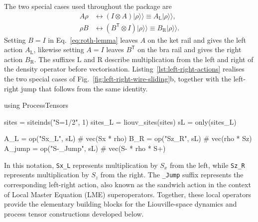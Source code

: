 The two special cases used throughout the package are
%
\begin{align}
    A\rho
    &\longleftrightarrow (I\otimes A)\lvert\rho\rangle\!\rangle \equiv
    A_{\mathrm L}\lvert\rho\rangle\!\rangle,
    \label{eq:left-action}\\
    \rho B
    &\longleftrightarrow (B^{\mathsf T}\otimes I)\lvert\rho\rangle\!\rangle \equiv
    B_{\mathrm R}\lvert\rho\rangle\!\rangle.
    \label{eq:right-action}
\end{align}
%
Setting \(B=I\) in Eq.~\eqref{eq:roth-lemma} leaves \(A\) on the ket rail and gives the left action \(A_{\mathrm L}\), likewise setting \(A=I\) leaves \(B^{\mathsf T}\) on the bra rail and gives the right action \(B_{\mathrm R}\).
The suffixes \(\mathrm L\) and \(\mathrm R\) describe multiplication from the left and right of the density operator before vectorisation.
Listing~\ref{lst:left-right-actions} realises the two special cases of Fig.~\ref{fig:left-right-wire-sliding}b, together with the left-right jump that follows from the same identity.

%
\begin{juliacode}[
    caption={Package notation for left, right, and left-right actions.},
    label={lst:left-right-actions},
]
using ProcessTensors

sites = siteinds("S=1/2", 1)
sites_L = liouv_sites(sites)
sL = only(sites_L)

A_L = op("Sx_L", sL)        # vec(Sx * rho)
B_R = op("Sz_R", sL)        # vec(rho * Sz)
A_jump = op("S-_Jump", sL)  # vec(S- * rho * S+)
\end{juliacode}
%

In this notation, \texttt{Sx\_L} represents multiplication by \(S_x\) from the left, while \texttt{Sz\_R} represents multiplication by \(S_z\) from the right.
The \texttt{\_Jump} suffix represents the corresponding left-right action, also known as the sandwich action in the context of Local Master Equation (LME) superoperators.
Together, these local operators provide the elementary building blocks for the Liouville-space dynamics and process tensor constructions developed below.

\label{subsec:liouville-mpos}

